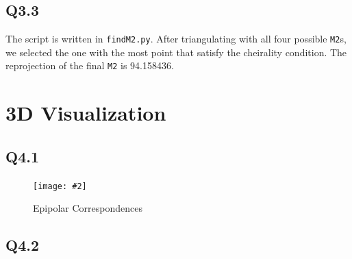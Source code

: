 \documentclass{article} %
\newcommand{\img}[3][0.3]{    
    \begin{figure}[h]
        \centering
        \texttt{[image: \#2]}
        \caption{#3}
    \end{figure}
}
\begin{document}
    \subsection*{Q3.3}
    The script is written in \verb*|findM2.py|. After triangulating with all four possible \verb|M2|s, we selected the one with the most point that satisfy the cheirality condition. The reprojection of the final \verb|M2| is 94.158436.

    \section{3D Visualization}
    \subsection*{Q4.1}
    \img{q4,1.png}{Epipolar Correspondences}

    \subsection*{Q4.2}
    
\end{document}
